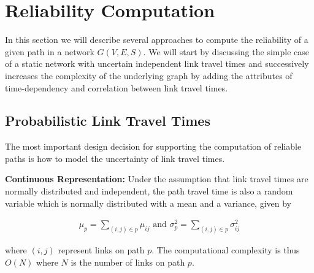 \section{Reliability Computation}
\label{sec:methods}
In this section we will describe several approaches to compute the reliability
of a given path in a network $G(V, E, S)$. We will start by discussing the
simple case of a static network with uncertain independent link travel times and
successively increases the complexity of the underlying graph by adding the
attributes of time-dependency and correlation between link travel times.

\subsection{Probabilistic Link Travel Times}
\label{subsec:static}
The most important design decision for supporting the computation of reliable
paths is how to model the uncertainty of link travel times. 

\textbf{Continuous Representation: }Under the assumption that link travel times
are normally distributed and independent, the path travel time is also a random variable which is normally
distributed with a mean and a variance, given by

\begin{gather}
\label{eq:normal}
	\mu_{p} = \sum_{(i,j)\in p} \mu_{ij} \text{ and } \sigma_{p}^2 =
	\sum_{(i,j)\in p} \sigma_{ij}^2 
\end{gather}

where $(i,j)$ represent links on path $p$. The computational complexity is thus
$O(N)$ where $N$ is the number of links on path $p$.

% 
% 

